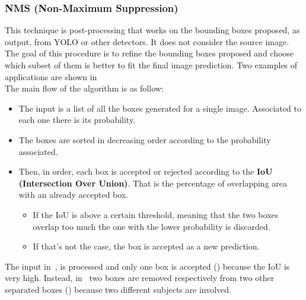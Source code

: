 \subsubsection*{NMS (Non-Maximum Suppression)}
This technique\cite{nms} is post-processing that works on the bounding boxes proposed, as output, from YOLO or other detectors. It does not consider the source image. The goal of this procedure is to refine the bounding boxes proposed and choose which subset of them is better to fit the final image prediction. Two examples of applications are shown in~\\
The main flow of the algorithm is as follow:
\begin{itemize}
	\item The input is a list of all the boxes generated for a single image. Associated to each one there is its probability.
	\item The boxes are sorted in decreasing order according to the probability associated.
	\item Then, in order, each box is accepted or rejected according to the \textbf{IoU (Intersection Over Union)}. That is the percentage of overlapping area with an already accepted box.
	\begin{itemize}
		\item If the IoU is above a certain threshold, meaning that the two boxes overlap too much the one with the lower probability is discarded.
		\item If that's not the case, the box is accepted as a new prediction.
	\end{itemize}
\end{itemize}

The input in~, is processed and only one box is accepted () because the IoU is very high. Instead, in~ two boxes are removed respectively from two other separated boxes () because two different subjects are involved.

